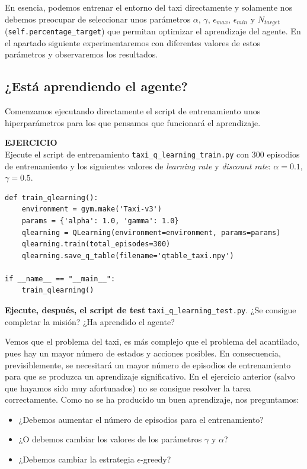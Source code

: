\documentclass{article}
\begin{document}
En esencia, podemos entrenar el entorno del taxi directamente y solamente nos debemos preocupar de seleccionar unos parámetros $\alpha$, $\gamma$, $\epsilon_{max}$, $\epsilon_{min}$ y $N_{target}$ (\texttt{self.percentage\_target}) que permitan optimizar el aprendizaje del agente. En el apartado siguiente experimentaremos con diferentes valores de estos parámetros y observaremos los resultados.


\subsection{¿Está aprendiendo el agente?}
Comenzamos ejecutando directamente el script de entrenamiento unos hiperparámetros para los que pensamos que funcionará el aprendizaje.

\begin{exercise}
\textbf{EJERCICIO}\\
    Ejecute el script de entrenamiento \texttt{taxi\_q\_learning\_train.py} con 300 episodios de entrenamiento y los siguientes valores de \textit{learning rate} y \textit{discount rate}: $\alpha=0.1$, $\gamma=0.5$. 
\begin{verbatim}
def train_qlearning():
    environment = gym.make('Taxi-v3')
    params = {'alpha': 1.0, 'gamma': 1.0}
    qlearning = QLearning(environment=environment, params=params)
    qlearning.train(total_episodes=300)
    qlearning.save_q_table(filename='qtable_taxi.npy')
    
if __name__ == "__main__":
    train_qlearning()    
\end{verbatim}
\textbf{Ejecute, después, el script de test} \texttt{taxi\_q\_learning\_test.py}. ¿Se consigue completar la misión? ¿Ha aprendido el agente?
\end{exercise}

Vemos que el problema del taxi, es más complejo que el problema del acantilado, pues hay un mayor número de estados y acciones posibles. En consecuencia, previsiblemente, se necesitará un mayor número de episodios de entrenamiento para que se produzca un aprendizaje significativo. En el ejercicio anterior (salvo que hayamos sido muy afortunados) no se consigue resolver la tarea correctamente. Como no se ha producido un buen aprendizaje, nos preguntamos:
\begin{itemize}
    \item ¿Debemos aumentar el número de episodios para el entrenamiento?
    \item ¿O debemos cambiar los valores de los parámetros $\gamma$ y $\alpha$?    
    \item ¿Debemos cambiar la estrategia $\epsilon$-greedy?    
\end{itemize}
\end{document}

